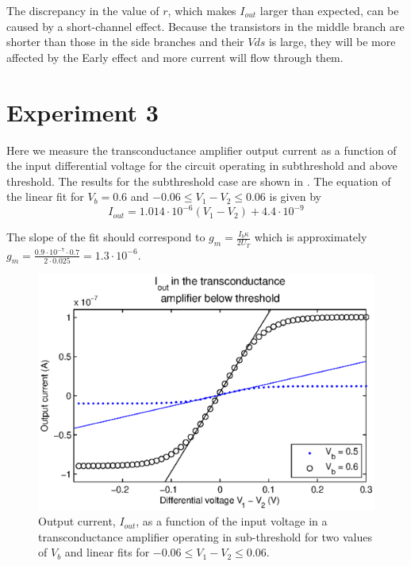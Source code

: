 The discrepancy in the value of \(r\), which makes \(I_{out}\) larger than expected, can be caused by a short-channel effect. Because the transistors in the middle branch are shorter than those in the side branches and their \(Vds\) is large, they will be more affected by the Early effect and more current will flow through them.\\ 

\section{Experiment 3}
Here we measure the transconductance amplifier output current as a function of the input differential voltage for the circuit operating in subthreshold and above threshold. The results for the subthreshold case are shown in . 
The equation of the linear fit for \(V_b=0.6\) and \(-0.06 \le V_1-V_2 \le 0.06\) is given by
\begin{equation*}
I_{out}= 1.014\cdot10^{-6}(V_1-V_2)+4.4\cdot10^{-9}
\end{equation*}

The slope of the fit should correspond to \(g_m=\frac{I_b\kappa}{2U_T}\) which is approximately \(g_m=\frac{0.9\cdot10^{-7}\cdot0.7}{2\cdot0.025}=1.3\cdot10^{-6}\).

\begin{figure}[!htb]
	\center
	\includegraphics{q3a.eps}
	\caption{Output current, \(I_{out}\), as a function of the input voltage in a transconductance amplifier operating in sub-threshold for two values of \(V_b\) and linear fits for \(-0.06 \le V_1-V_2 \le 0.06\).}
	\label{fig:ex3a}
\end{figure}

